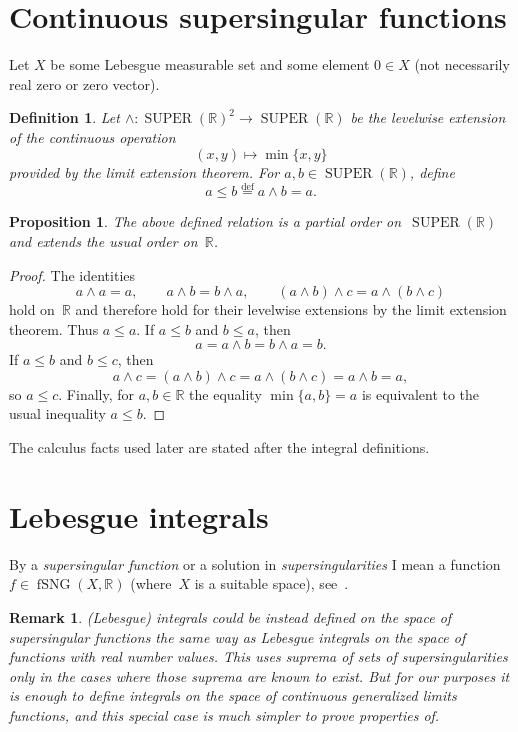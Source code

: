 \documentclass{amsart}
\newtheorem{prop}{Proposition}
\newtheorem{defn}{Definition}
\newtheorem{rem}{Remark}
\DeclareMathOperator{\SUPER}{SUPER}
\DeclareMathOperator{\fSNG}{fSNG}
\newcommand{\eqdef}{\overset{\mathrm{def}}{=}}
\begin{document}
\section{Continuous supersingular functions}

Let $X$ be some Lebesgue measurable set and some element $0\in X$ (not necessarily real zero or zero vector).

\begin{defn}
Let $\wedge:\SUPER(\mathbb{R})^2\to\SUPER(\mathbb{R})$ be the
levelwise extension of the continuous operation
\[
  (x,y)\mapsto\min\{x,y\}
\]
provided by the limit extension theorem.  For $a,b\in\SUPER(\mathbb{R})$,
define
\[
  a\leq b \eqdef a\wedge b=a.
\]
\end{defn}

\begin{prop}
The above defined relation is a partial order on~$\SUPER(\mathbb{R})$ and
extends the usual order on~$\mathbb{R}$.
\end{prop}

\begin{proof}
The identities
\[
  a\wedge a=a,\qquad
  a\wedge b=b\wedge a,\qquad
  (a\wedge b)\wedge c=a\wedge(b\wedge c)
\]
hold on~$\mathbb{R}$ and therefore hold for their levelwise extensions by the
limit extension theorem.  Thus $a\leq a$.  If $a\leq b$ and $b\leq a$, then
\[
  a=a\wedge b=b\wedge a=b.
\]
If $a\leq b$ and $b\leq c$, then
\[
  a\wedge c=(a\wedge b)\wedge c
  =a\wedge(b\wedge c)=a\wedge b=a,
\]
so $a\leq c$.  Finally, for $a,b\in\mathbb{R}$ the equality
$\min\{a,b\}=a$ is equivalent to the usual inequality $a\leq b$.
\end{proof}

The calculus facts used later are stated after the integral definitions.

\section{Lebesgue integrals}

By a \emph{supersingular function} or a solution in \emph{supersingularities} I mean a function $f\in\fSNG(X,\mathbb{R})$ (where~$X$ is a suitable space), see~\cite{limit}.

\begin{rem}
(Lebesgue) integrals could be instead defined on the space of supersingular
functions the same way as Lebesgue integrals on the space of functions with
real number values.  This uses suprema of sets of supersingularities only in
the cases where those suprema are known to exist.  But for our purposes it is
enough to define integrals on the space of continuous generalized limits
functions, and this special case is much simpler to prove properties of.
\end{rem}
\end{document}

